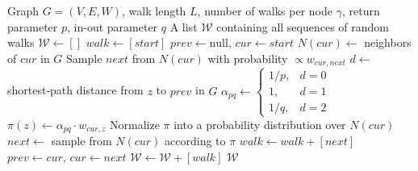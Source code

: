 \documentclass[pdflatex,sn-mathphys-num,iicol]{sn-jnl}%
\theoremstyle{thmstyleone}%
\theoremstyle{thmstyletwo}%
\theoremstyle{thmstylethree}%
\begin{document}
\begin{algorithm*}[t]
\caption{GenerateRandomWalks (Node2Vec)}
\label{alg:random_walk}
\begin{algorithmic}[1]
\Require Graph $G=(V,E,W)$, walk length $L$, number of walks per node $\gamma$, return parameter $p$, in-out parameter $q$
\Ensure A list $\mathcal{W}$ containing all sequences of random walks
\State $\mathcal{W} \gets []$ 
     
        \State $walk \gets [start]$ 
        \State $prev \gets \text{null}$, $cur \gets start$
         
            \State $N(cur) \gets$ neighbors of $cur$ in $G$
             
                \State Sample $next$ from $N(cur)$ with probability $\propto w_{cur,next}$
            \Else
                \State {}
                    \State $d \gets$ shortest-path distance from $z$ to $prev$ in $G$
                    \State $\alpha_{pq} \gets \begin{cases} 1/p, & d = 0 \\ 1, & d = 1 \\ 1/q, & d = 2 \end{cases}$
                    \State $\pi(z) \gets \alpha_{pq} \cdot w_{cur,z}$ 
                \EndFor
                \State Normalize $\pi$ into a probability distribution over $N(cur)$
                \State $next \gets$ sample from $N(cur)$ according to $\pi$
            \EndIf
            \State $walk \gets walk + [next]$ 
            \State $prev \gets cur$, $cur \gets next$
        \EndFor
        \State $\mathcal{W} \gets \mathcal{W} + [walk]$ 
    \EndFor
\EndFor
\State \Return $\mathcal{W}$ 
\end{algorithmic}
\end{algorithm*}





\end{document}
